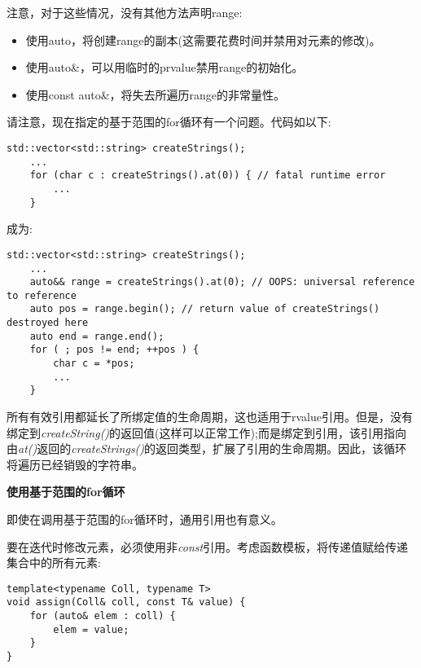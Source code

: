 注意，对于这些情况，没有其他方法声明range:\par

\begin{itemize}
	\item 使用auto，将创建range的副本(这需要花费时间并禁用对元素的修改)。
	\item 使用auto\&，可以用临时的prvalue禁用range的初始化。
	\item 使用const auto\&，将失去所遍历range的非常量性。
\end{itemize}

请注意，现在指定的基于范围的for循环有一个问题。代码如以下:\par

\begin{lstlisting}[caption={}]
	std::vector<std::string> createStrings();
	...
	for (char c : createStrings().at(0)) { // fatal runtime error
		...
	}
\end{lstlisting}

成为:\par

\begin{lstlisting}[caption={}]
	std::vector<std::string> createStrings();
	...
	auto&& range = createStrings().at(0); // OOPS: universal reference to reference
	auto pos = range.begin(); // return value of createStrings() destroyed here
	auto end = range.end();
	for ( ; pos != end; ++pos ) {
		char c = *pos;
		...
	}
\end{lstlisting}

所有有效引用都延长了所绑定值的生命周期，这也适用于rvalue引用。但是，没有绑定到\textit{createString()}的返回值(这样可以正常工作);而是绑定到引用，该引用指向由\textit{at()}返回的\textit{createStrings()}的返回类型，扩展了引用的生命周期。因此，该循环将遍历已经销毁的字符串。\par

\hspace*{\fill} \par %
\textbf{使用基于范围的for循环}

即使在调用基于范围的for循环时，通用引用也有意义。\par

要在迭代时修改元素，必须使用非\textit{const}引用。考虑函数模板，将传递值赋给传递集合中的所有元素:\par

\begin{lstlisting}[caption={}]
template<typename Coll, typename T>
void assign(Coll& coll, const T& value) {
	for (auto& elem : coll) {
		elem = value;
	}
}
\end{lstlisting}

